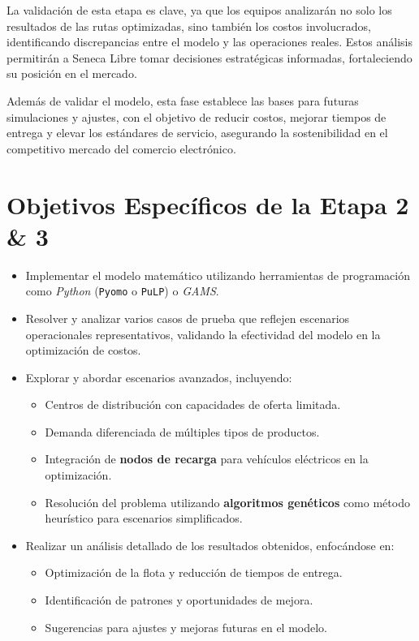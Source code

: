 \documentclass[12pt]{article}
\begin{document}
La validación de esta etapa es clave, ya que los equipos analizarán no solo los resultados de las rutas optimizadas, sino también los costos involucrados, identificando discrepancias entre el modelo y las operaciones reales. Estos análisis permitirán a Seneca Libre tomar decisiones estratégicas informadas, fortaleciendo su posición en el mercado.

Además de validar el modelo, esta fase establece las bases para futuras simulaciones y ajustes, con el objetivo de reducir costos, mejorar tiempos de entrega y elevar los estándares de servicio, asegurando la sostenibilidad en el competitivo mercado del comercio electrónico.

\section{Objetivos Específicos de la Etapa 2 \& 3}
\begin{itemize}
    \item Implementar el modelo matemático utilizando herramientas de programación como \textit{Python} (\texttt{Pyomo} o \texttt{PuLP}) o \textit{GAMS}.
    \item Resolver y analizar varios casos de prueba que reflejen escenarios operacionales representativos, validando la efectividad del modelo en la optimización de costos.
    \item Explorar y abordar escenarios avanzados, incluyendo:
    \begin{itemize}
        \item Centros de distribución con capacidades de oferta limitada.
        \item Demanda diferenciada de múltiples tipos de productos.
        \item Integración de \textbf{nodos de recarga} para vehículos eléctricos en la optimización.
        \item Resolución del problema utilizando \textbf{algoritmos genéticos} como método heurístico para escenarios simplificados.
    \end{itemize}
    \item Realizar un análisis detallado de los resultados obtenidos, enfocándose en:
    \begin{itemize}
        \item Optimización de la flota y reducción de tiempos de entrega.
        \item Identificación de patrones y oportunidades de mejora.
        \item Sugerencias para ajustes y mejoras futuras en el modelo.
    \end{itemize}
\end{itemize}
\end{document}
